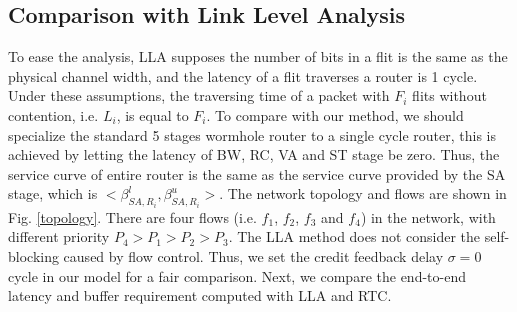\documentclass[10pt,journal]{IEEEtran}
\begin{document}
\subsection{Comparison with Link Level Analysis}\label{llacmp}
To ease the analysis, LLA supposes the number of bits in a flit is the same as the physical channel width, and the latency of a flit traverses a router is 1 cycle. Under these assumptions, the traversing time of a packet with $F_i$ flits without contention, i.e. $L_i$, is equal to $F_i$. To compare with our method, we should specialize the standard 5 stages wormhole router to a single cycle router, this is achieved by letting the latency of BW, RC, VA and ST stage be zero. Thus, the service curve of entire router is the same as the service curve provided by the SA stage, which is $<\beta_{SA,R_i}^l,\beta_{SA,R_i}^u>$. The network topology and flows are shown in Fig. \ref{topology}. There are four flows (i.e. $f_1$, $f_2$, $f_3$ and $f_4$) in the network, with different priority $P_4>P_1>P_2>P_3$. The LLA method does not consider the self-blocking caused by flow control. Thus, we set the credit feedback delay $\sigma=0$ cycle in our model for a fair comparison. Next, we compare the end-to-end latency and buffer requirement computed with LLA and RTC.
\end{document}
